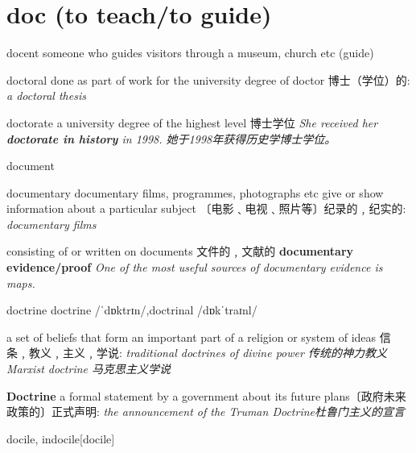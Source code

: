 \section{doc (to teach/to guide)}

\begin{DefWord}{docent}
    someone who guides visitors through a museum, church etc (guide)
\end{DefWord}

\begin{DefWord}{doctoral}
    done as part of work for the university degree of doctor
    博士（学位）的:
    \textit{a doctoral thesis}
\end{DefWord}

\begin{DefWord}{doctorate}
    a university degree of the highest level 博士学位
    \textit{She received her \textbf{doctorate in history} in 1998. 她于1998年获得历史学博士学位。}
\end{DefWord}


\begin{DefWord}{document}
\end{DefWord}

\begin{DefWord}{documentary}
    documentary films, programmes, photographs etc give or show information about a particular subject
    〔电影﹑电视﹑照片等〕纪录的﹐纪实的:
    \textit{documentary films}

    consisting of or written on documents
    文件的﹐文献的
    \textbf{documentary evidence/proof}
    \textit{One of the most useful sources of documentary evidence is maps.}
\end{DefWord}

\begin{DefWord}{doctrine}
    doctrine /ˈdɒktrɪn/,doctrinal /dɒkˈtraɪnl/

    a set of beliefs that form an important part of a religion or system of ideas
    信条﹐教义﹐主义﹐学说:
    \textit{traditional doctrines of divine power 传统的神力教义}
    \textit{Marxist doctrine 马克思主义学说}

    \textbf{Doctrine}  a formal statement by a government about its future plans〔政府未来政策的〕正式声明:
    \textit{the announcement of the Truman Doctrine杜鲁门主义的宣言}
\end{DefWord}

\begin{DefWord}{docile, indocile}[docile]
\end{DefWord}